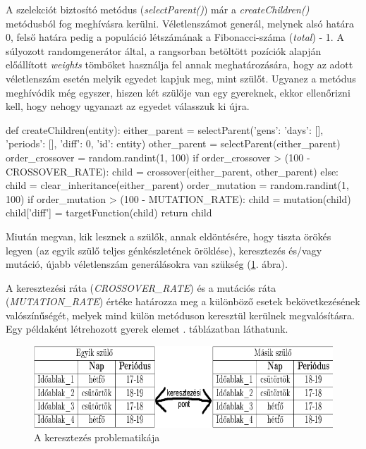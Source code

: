 A szelekciót biztosító metódus (\textit{selectParent()}) már a \textit{createChildren()} metódusból fog meghívásra kerülni. Véletlenszámot generál, melynek alsó határa 0, felső határa pedig a populáció létszámának a Fibonacci-száma (\textit{total}) - 1. A súlyozott randomgenerátor által, a rangsorban betöltött pozíciók alapján előállított \textit{weights} tömböket használja fel annak meghatározására, hogy az adott véletlenszám esetén melyik egyedet kapjuk meg, mint szülőt. Ugyanez a metódus meghívódik még egyszer, hiszen két szülője van egy gyereknek, ekkor ellenőrizni kell, hogy nehogy ugyanazt az egyedet válasszuk ki újra.

\begin{python}
def createChildren(entity):
    either_parent = selectParent({'gens': {'days': [], 'periods': []}, 
                    'diff': 0, 'id': entity})
    other_parent = selectParent(either_parent)
    order_crossover = random.randint(1, 100)
    if order_crossover > (100 - CROSSOVER_RATE):
        child = crossover(either_parent, other_parent)
    else:
        child = clear_inheritance(either_parent)
    order_mutation = random.randint(1, 100)
    if order_mutation > (100 - MUTATION_RATE):
        child = mutation(child)
    child['diff'] = targetFunction(child)
    return child
\end{python}

Miután megvan, kik lesznek a szülők, annak eldöntésére, hogy tiszta örökés legyen (az egyik szülő teljes génkészletének öröklése), keresztezés és/vagy mutáció, újabb véletlenszám generálásokra van szükség (\ref{fig:pelda}. ábra).

A keresztezési ráta (\textit{CROSSOVER\_RATE}) és a mutációs ráta \\
(\textit{MUTATION\_RATE}) értéke határozza meg a különböző esetek bekövetkezésének valószínűségét, melyek mind külön metóduson keresztül kerülnek megvalósításra. Egy példaként létrehozott gyerek elemet . táblázatban láthatunk.

\begin{figure}
\centering
\includegraphics[width=\linewidth]{images/pelda.png}
\caption{A keresztezés problematikája}
\label{fig:pelda}
\end{figure}


